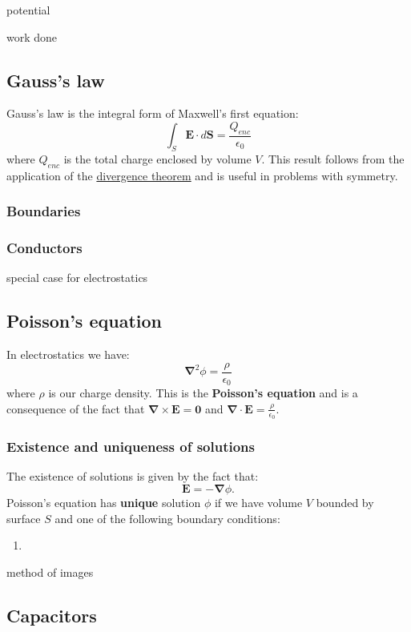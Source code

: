 \documentclass{article}
\begin{document}
potential

work done

\newpage

\subsection{Gauss's law}
Gauss's law is the integral form of Maxwell's first equation:
$$\int_S\boldsymbol{E}\cdot d\boldsymbol{S}
=\frac{Q_{enc}}{\epsilon_0}$$
where $Q_{enc}$ is the total charge enclosed by volume $V$. This result follows from the application of the \underline{divergence theorem} and is useful in problems with symmetry. 

\subsubsection{Boundaries}

\subsubsection{Conductors}
special case for electrostatics

\newpage

\subsection{Poisson's equation}
In electrostatics we have:
$$\boldsymbol{\nabla}^2\phi=\frac{\rho}{\epsilon_0}$$
where $\rho$ is our charge density. This is the \textbf{Poisson's equation}
and is a consequence of the fact that
$\boldsymbol{\nabla}\times\boldsymbol{E}=\boldsymbol{0}$ and
$\boldsymbol{\nabla}\cdot\boldsymbol{E}=\displaystyle\frac{\rho}{\epsilon_0}$.

\subsubsection{Existence and uniqueness of solutions}
The existence of solutions is given by the fact that:
$$\boldsymbol{E}=-\boldsymbol{\nabla}\phi.$$
Poisson's equation has \textbf{unique} solution $\phi$
if we have volume $V$ bounded by surface $S$
and one of the following boundary conditions:
\begin{enumerate}
    \item 
\end{enumerate}

method of images

\subsection{Capacitors}
\end{document}
